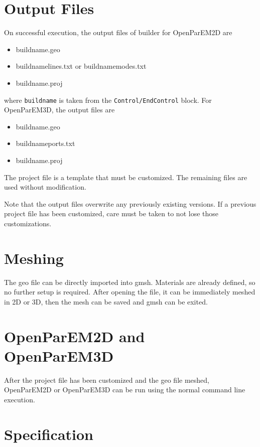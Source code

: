 \documentclass[titlepage]{article}
\renewcommand\_{\textunderscore\linebreak[1]}
\begin{document}
\section{Output Files}

On successful execution, the output files of builder for OpenParEM2D are
\begin{itemize}
\item build\_name.geo
\item build\_name\_lines.txt or build\_name\_modes.txt
\item build\_name.proj
\end{itemize}
where \texttt{build\_name} is taken from the \texttt{Control/EndControl} block.  For OpenParEM3D, the output files are
\begin{itemize}
\item build\_name.geo
\item build\_name\_ports.txt
\item build\_name.proj
\end{itemize}
The project file is a template that must be customized.  The remaining files are used without modification.

Note that the output files overwrite any previously existing versions.  If a previous project file has been customized, care must be taken to not lose those customizations.

\section{Meshing}

The geo file can be directly imported into gmsh.  Materials are already defined, so no further setup is required.  After opening the file, it can be immediately meshed in 2D or 3D, then the mesh can be saved and gmsh can be exited.

\section{OpenParEM2D and OpenParEM3D}

After the project file has been customized and the geo file meshed, OpenParEM2D or OpenParEM3D can be run using the normal command line execution.

\section{Specification}
\label{sec:spec}
\end{document}
